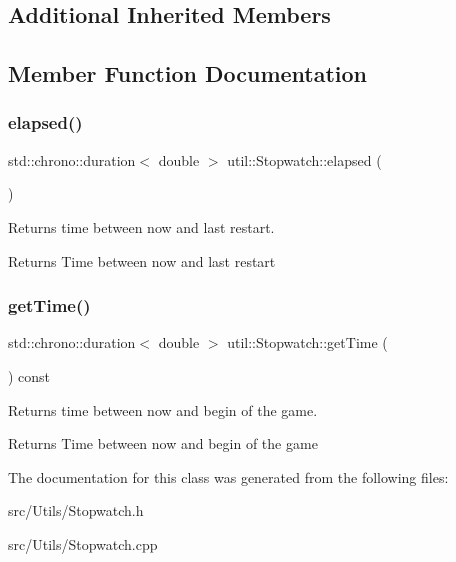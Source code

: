 \subsection*{Additional Inherited Members}


\subsection{Member Function Documentation}
\mbox{\label{classutil_1_1_stopwatch_a24598e1f60920a455f65a0b730043bcf}} 
\subsubsection{\texorpdfstring{elapsed()}{elapsed()}}
{\footnotesize\ttfamily std\+::chrono\+::duration$<$ double $>$ util\+::\+Stopwatch\+::elapsed (\begin{DoxyParamCaption}{ }\end{DoxyParamCaption})}



Returns time between now and last restart. 

\begin{DoxyReturn}{Returns}
Time between now and last restart 
\end{DoxyReturn}
\mbox{\label{classutil_1_1_stopwatch_a54385cbe9d8e3b42f9af7508bd3c49ec}} 
\subsubsection{\texorpdfstring{get\+Time()}{getTime()}}
{\footnotesize\ttfamily std\+::chrono\+::duration$<$ double $>$ util\+::\+Stopwatch\+::get\+Time (\begin{DoxyParamCaption}{ }\end{DoxyParamCaption}) const}



Returns time between now and begin of the game. 

\begin{DoxyReturn}{Returns}
Time between now and begin of the game 
\end{DoxyReturn}


The documentation for this class was generated from the following files\+:\begin{DoxyCompactItemize}
\item 
src/\+Utils/Stopwatch.\+h\item 
src/\+Utils/Stopwatch.\+cpp\end{DoxyCompactItemize}
